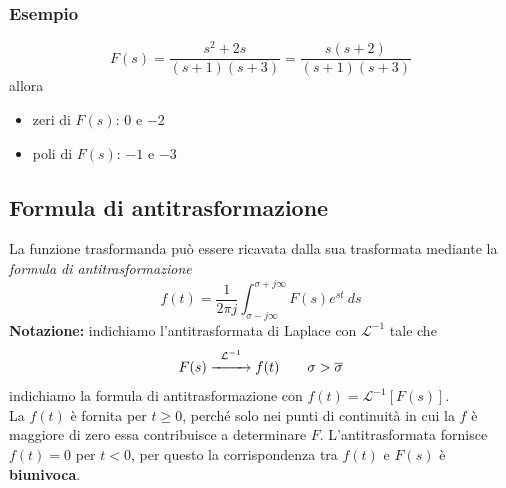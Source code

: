 \documentclass{article}
\numberwithin{equation}{subsection}
\let\oldsubsection\subsection%
\renewcommand{\subsection}{%
  \renewcommand{\theequation}{\thesubsection.\arabic{equation}}%
  \oldsubsection}%
\begin{document}
\subsubsection*{Esempio}
\begin{equation}
    F(s) = \frac{s^2+2s}{(s+1)(s+3)} = \frac{s(s+2)}{(s+1)(s+3)}
\end{equation}
allora
\begin{itemize}
    \item zeri di $F(s)$: $0$ e $-2$
    \item poli di $F(s)$: $-1$ e $-3$
\end{itemize}


\subsection{Formula di antitrasformazione}
La funzione trasformanda può essere ricavata dalla sua trasformata
mediante la \textit{formula di antitrasformazione}
\begin{equation}
    f(t) = \frac{1}{2 \pi j} \int _{\sigma-j \infty}^{\sigma+j \infty} F(s) e^{st} \ ds
\end{equation}
\textbf{Notazione:} indichiamo l'antitrasformata di Laplace con $\mathcal{L}^{-1}$ tale che
\begin{equation}
    F(s) \overset{\mathcal{L}^{-1}}{\xrightarrow{\hspace*{0.8cm}}} f(t) \tag*{$\sigma > \overline{\sigma}$}
\end{equation}
indichiamo la formula di antitrasformazione con $f(t) = \mathcal{L}^{-1}[F(s)]$.
\vspace*{0.2cm}\\
La $f(t)$ è fornita per $t\geq 0$, perché solo nei punti di continuità in cui la $f$ è maggiore di zero essa contribuisce a determinare $F$. L'antitrasformata fornisce $f(t)=0$ per $t<0$, per questo la corrispondenza tra $f(t)$ e $F(s)$ è \textbf{biunivoca}.
\end{document}
